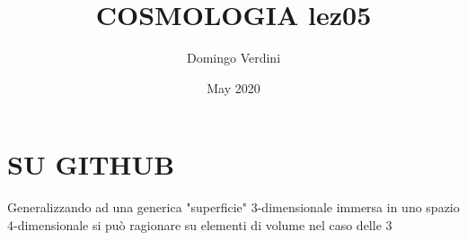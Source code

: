 \documentclass{article}
\title{COSMOLOGIA lez05}
\author{Domingo Verdini }
\date{May 2020}
\begin{document}
\maketitle
    \section{SU GITHUB}
    Generalizzando ad una generica "superficie" 3-dimensionale immersa in uno spazio 4-dimensionale si può ragionare su elementi di volume nel caso delle 3
    
\end{document}
